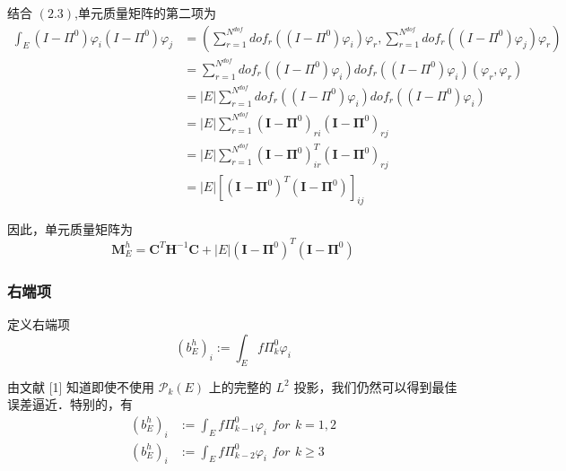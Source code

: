结合 $(2.3)$,单元质量矩阵的第二项为 \\
\begin{equation}
\begin{aligned}
\int_{E}(I - \Pi^0)\varphi_i(I - \Pi^0)\varphi_j & = (\sum_{r = 1}^{N^{dof}}dof_r((I - \Pi^0)\varphi_i)\varphi_r, \sum_{r = 1}^{N^{dof}}dof_r((I - \Pi^0)\varphi_j)\varphi_r) \\
& = \sum_{r = 1}^{N^{dof}}dof_r((I - \Pi^0)\varphi_i)dof_r((I - \Pi^0)\varphi_i)(\varphi_r,\varphi_r) \\
& = |E|\sum_{r = 1}^{N^{dof}}dof_r((I - \Pi^0)\varphi_i)dof_r((I - \Pi^0)\varphi_i) \\
& = |E|\sum_{r = 1}^{N^{dof}}(\mathbf{I} - \boldsymbol \Pi^0)_{ri}(\mathbf{I} - \boldsymbol \Pi^0)_{rj} \\
& = |E|\sum_{r = 1}^{N^{dof}}(\mathbf{I} - \boldsymbol \Pi^0)_{ir}^T(\mathbf{I} - \boldsymbol \Pi^0)_{rj} \\
& = |E|\left[(\mathbf{I} - \boldsymbol \Pi^0)^T(\mathbf{I} - \boldsymbol \Pi^0)\right]_{ij}
\end{aligned}
\end{equation}

因此，单元质量矩阵为 \\
\begin{equation}
\mathbf M_E^h = \mathbf C^T\mathbf H^{-1}\mathbf C + |E|(\mathbf I - \boldsymbol \Pi^0)^T(\mathbf I - \boldsymbol \Pi^0)
\end{equation}

\subsubsection{右端项}

定义右端项 \\
\begin{equation}
(b_E^h)_i := \int_{E}f\Pi_k^0\varphi_i
\end{equation}

由文献 [1] 知道即使不使用 $\mathcal P_k(E)$ 上的完整的 $L^2$ 投影，我们仍然可以得到最佳误差逼近．特别的，有 \\
\begin{equation}
\begin{aligned}
(b_E^h)_i & := \int_{E}f\Pi_{k-1}^0\varphi_i\,\ for \,\ k = 1,2 \\
(b_E^h)_i & := \int_{E}f\Pi_{k-2}^0\varphi_i\,\ for \,\ k \ge 3
\end{aligned}
\end{equation}

